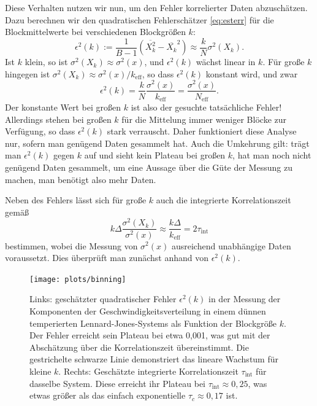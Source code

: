 Diese Verhalten nutzen wir nun, um den Fehler korrelierter Daten
abzuschätzen. Dazu berechnen wir den quadratischen Fehlerschätzer
\eqref{eq:esterr} für die Blockmittelwerte bei verschiedenen
Blockgrößen $k$:
\begin{equation}
  \epsilon^2(k) := \frac{1}{B - 1} \left(\overline{X_k^2} -
    \overline{X_k}^2\right) \approx \frac{k}{N} \sigma^2(X_k).
\end{equation}
Ist $k$ klein, so ist $\sigma^2(X_k)\approx \sigma^2(x)$, und
$\epsilon^2(k)$ wächst linear in $k$. Für große $k$ hingegen ist
$\sigma^2(X_k) \approx \sigma^2(x)/k_\text{eff}$, so dass
$\epsilon^2(k)$ konstant wird, und zwar
\begin{equation}
  \epsilon^2(k)= \frac{k}{N}\frac{\sigma^2(x)}{k_\text{eff}} =
  \frac{\sigma^2(x)}{N_\text{eff}}.
\end{equation}
Der konstante Wert bei großen $k$ ist also der gesuchte tatsächliche
Fehler!  Allerdings stehen bei großen $k$ für die Mittelung immer
weniger Blöcke zur Verfügung, so dass $\epsilon^2(k)$ stark
verrauscht. Daher funktioniert diese Analyse nur, sofern man genügend
Daten gesammelt hat. Auch die Umkehrung gilt: trägt man
$\epsilon^2(k)$ gegen $k$ auf und sieht kein Plateau bei großen $k$,
hat man noch nicht genügend Daten gesammelt, um eine Aussage über die
Güte der Messung zu machen, man benötigt also mehr Daten.

Neben des Fehlers lässt sich für große $k$ auch die integrierte
Korrelationszeit gemäß
\begin{equation}
  \label{eq:tauint}
  k \Delta\frac{\sigma^2(X_k)}{\sigma^2(x)} \approx
  \frac{k\Delta}{k_\text{eff}} = 2\tau_\text{int}
\end{equation}
bestimmen, wobei die Messung von $\sigma^2(x)$ ausreichend unabhängige
Daten voraussetzt. Dies überprüft man zunächst anhand von
$\epsilon^2(k)$.

\begin{figure}
  \centering
  \texttt{[image: plots/binning]}
  \caption{Links: geschätzter quadratischer Fehler $\epsilon^2(k)$ in
    der Messung der Komponenten der Geschwindigkeitsverteilung in
    einem dünnen temperierten Lennard-Jones-Systems als Funktion der
    Blockgröße $k$. Der Fehler erreicht sein Plateau bei etwa
    0,001, was gut mit der Abschätzung über die Korrelationszeit
    übereinstimmt.  Die gestrichelte schwarze Linie demonstriert das
    lineare Wachstum für kleine $k$. Rechts: Geschätzte integrierte
    Korrelationszeit $\tau_\text{int}$ für dasselbe System.  Diese
    erreicht ihr Plateau bei $\tau_\text{int} \approx 0,25$, was etwas
    größer als das einfach exponentielle $\tau_c\approx 0,17$ ist.}
  \label{fig:binning}
\end{figure}

